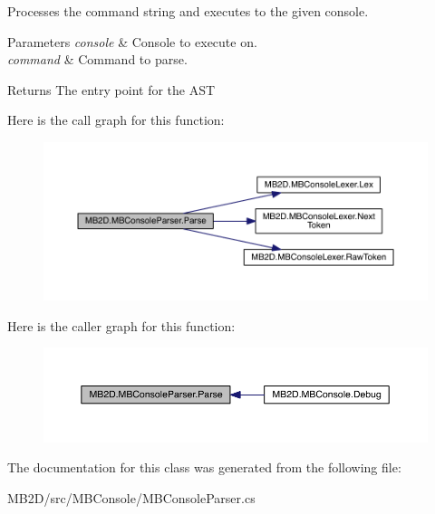 Processes the command string and executes to the given console. 


\begin{DoxyParams}{Parameters}
{\em console} & Console to execute on.\\
\hline
{\em command} & Command to parse.\\
\hline
\end{DoxyParams}
\begin{DoxyReturn}{Returns}
The entry point for the A\+ST
\end{DoxyReturn}
Here is the call graph for this function\+:\nopagebreak
\begin{figure}[H]
\begin{center}
\leavevmode
\includegraphics[width=350pt]{class_m_b2_d_1_1_m_b_console_parser_a880d5a9c56db05d19610df482b15bbf0_cgraph}
\end{center}
\end{figure}
Here is the caller graph for this function\+:\nopagebreak
\begin{figure}[H]
\begin{center}
\leavevmode
\includegraphics[width=350pt]{class_m_b2_d_1_1_m_b_console_parser_a880d5a9c56db05d19610df482b15bbf0_icgraph}
\end{center}
\end{figure}


The documentation for this class was generated from the following file\+:\begin{DoxyCompactItemize}
\item 
M\+B2\+D/src/\+M\+B\+Console/M\+B\+Console\+Parser.\+cs\end{DoxyCompactItemize}
